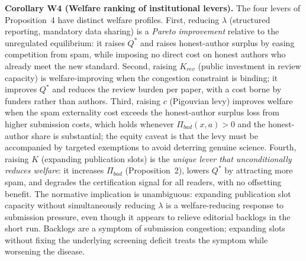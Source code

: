 \documentclass{article}
\begin{document}
\medskip
\noindent\textbf{Corollary W4 (Welfare ranking of institutional levers).}
The four levers of Proposition~4 have distinct welfare profiles.
First, reducing $\lambda$ (structured reporting, mandatory data sharing) is a \emph{Pareto improvement} relative to the unregulated equilibrium: it raises $Q^*$ and raises honest-author surplus by easing competition from spam, while imposing no direct cost on honest authors who already meet the new standard.
Second, raising $K_{rev}$ (public investment in review capacity) is welfare-improving when the congestion constraint is binding; it improves $Q^*$ and reduces the review burden per paper, with a cost borne by funders rather than authors.
Third, raising $c$ (Pigouvian levy) improves welfare when the spam externality cost exceeds the honest-author surplus loss from higher submission costs, which holds whenever $\Pi_{bad}(x,a) > 0$ and the honest-author share is substantial; the equity caveat is that the levy must be accompanied by targeted exemptions to avoid deterring genuine science.
Fourth, raising $K$ (expanding publication slots) is the \emph{unique lever that unconditionally reduces welfare}: it increases $\Pi_{bad}$ (Proposition~2), lowers $Q^*$ by attracting more spam, and degrades the certification signal for all readers, with no offsetting benefit.
The normative implication is unambiguous: expanding publication slot capacity without simultaneously reducing $\lambda$ is a welfare-reducing response to submission pressure, even though it appears to relieve editorial backlogs in the short run.
Backlogs are a symptom of submission congestion; expanding slots without fixing the underlying screening deficit treats the symptom while worsening the disease.
\end{document}
